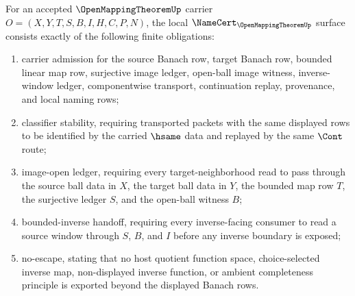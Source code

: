 \begin{theorem}
\label{thm:open-mapping-theorem-namecert-obligations}
For an accepted $\OpenMappingTheoremUp$ carrier $O=(X,Y,T,S,B,I,H,C,P,N)$, the local $\NameCert_{\OpenMappingTheoremUp}$ surface consists exactly of the following finite obligations:
\begin{enumerate}
\item carrier admission for the source Banach row, target Banach row, bounded linear map row, surjective image ledger, open-ball image witness, inverse-window ledger, componentwise transport, continuation replay, provenance, and local naming rows;
\item classifier stability, requiring transported packets with the same displayed rows to be identified by the carried $\hsame$ data and replayed by the same $\Cont$ route;
\item image-open ledger, requiring every target-neighborhood read to pass through the source ball data in $X$, the target ball data in $Y$, the bounded map row $T$, the surjective ledger $S$, and the open-ball witness $B$;
\item bounded-inverse handoff, requiring every inverse-facing consumer to read a source window through $S$, $B$, and $I$ before any inverse boundary is exposed;
\item no-escape, stating that no host quotient function space, choice-selected inverse map, non-displayed inverse function, or ambient completeness principle is exported beyond the displayed Banach rows.
\end{enumerate}
\end{theorem}
